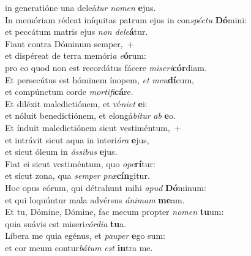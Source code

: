 \evenverse in generatióne una deleá\textit{tur} \textit{no}\textit{men} \textbf{e}jus.\\
\oddverse In memóriam rédeat iníquitas patrum ejus in con\textit{spé}\textit{ctu} \textbf{Dó}mini:~\*\\
\oddverse et peccátum matris ejus \textit{non} \textit{de}\textit{le}\textbf{á}tur.\\
\evenverse Fiant contra Dóminum semper,~+\\
\evenverse  et dispéreat de terra memóri\textit{a} \textit{e}\textbf{ó}rum:~\*\\
\evenverse pro eo quod non est recordátus fácere \textit{mi}\textit{se}\textit{ri}\textbf{cór}diam.\\
\oddverse Et persecútus est hóminem ínopem, \textit{et} \textit{men}\textbf{dí}cum,~\*\\
\oddverse et compúnctum corde \textit{mor}\textit{ti}\textit{fi}\textbf{cá}re.\\
\evenverse Et diléxit maledictiónem, et vé\textit{ni}\textit{et} \textbf{e}i:~\*\\
\evenverse et nóluit benedictiónem, et elongá\textit{bi}\textit{tur} \textit{ab} \textbf{e}o.\\
\oddverse Et índuit maledictiónem sicut vestiméntum,~+\\
\oddverse  et intrávit sicut aqua in interi\textit{ó}\textit{ra} \textbf{e}jus,~\*\\
\oddverse et sicut óleum in \textit{ós}\textit{si}\textit{bus} \textbf{e}jus.\\
\evenverse Fiat ei sicut vestiméntum, quo \textit{o}\textit{pe}\textbf{rí}tur:~\*\\
\evenverse et sicut zona, qua \textit{sem}\textit{per} \textit{præ}\textbf{cín}gitur.\\
\oddverse Hoc opus eórum, qui détrahunt mihi \textit{a}\textit{pud} \textbf{Dó}minum:~\*\\
\oddverse et qui loquúntur mala advérsus \textit{á}\textit{ni}\textit{mam} \textbf{me}am.\\
\evenverse Et tu, Dómine, Dómine, fac mecum propter \textit{no}\textit{men} \textbf{tu}um:~\*\\
\evenverse quia suávis est miseri\textit{cór}\textit{di}\textit{a} \textbf{tu}a.\\
\oddverse Líbera me quia egénus, et \textit{pau}\textit{per} \textbf{e}go sum:~\*\\
\oddverse et cor meum contur\textit{bá}\textit{tum} \textit{est} \textbf{in}tra me.\\
